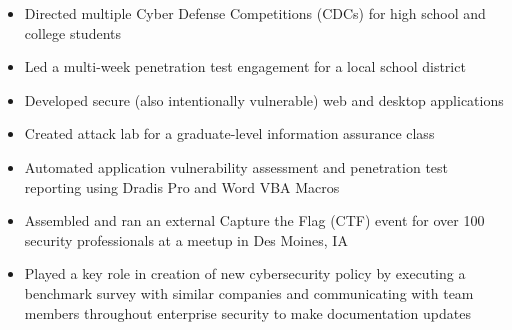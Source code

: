 \documentclass[10pt,usletter,ragged2e,withhyper]{altacv}
\begin{document}
\begin{paracol}{2}
\divider

\begin{itemize}
\item Directed multiple Cyber Defense Competitions (CDCs) for high school and college students
\item Led a multi-week penetration test engagement for a local school district
\item Developed secure (also intentionally vulnerable) web and desktop applications
\item Created attack lab for a graduate-level information assurance class
\end{itemize}

\divider

\begin{itemize}
\item Automated application vulnerability assessment and penetration test reporting using Dradis Pro and Word VBA Macros
\item Assembled and ran an external Capture the Flag (CTF) event for over 100 security professionals at a meetup in Des Moines, IA
\end{itemize}

\divider

\begin{itemize}
\item Played a key role in creation of new cybersecurity policy by executing a benchmark survey with similar companies and communicating with team members throughout enterprise security to make documentation updates
\end{itemize}


\hspace*{-1em}  %


\end{paracol}
\end{document}
